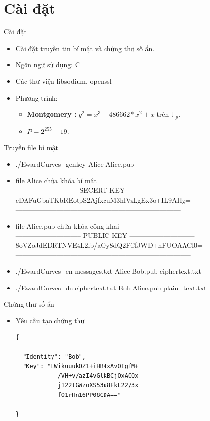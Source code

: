\documentclass[compress]{beamer}
\begin{document}
\section*{Cài đặt}
\begin{frame}{Cài đặt}
\begin{itemize}
\item Cài đặt truyền tin bí mật và chứng thư số ẩn.
\item Ngôn ngữ sử dụng: C
\item Các thư viện libsodium, openssl
\item Phương trình:
\begin{itemize}
\item \textbf{Montgomery :} $y^2 = x^3 + 486662*x^2 + x$ trên $\mathbb{F}_p$.
\item $P = 2^{255} - 19$.
\end{itemize}
\end{itemize}
\end{frame}
\begin{frame}{Truyền file bí mật}
\begin{itemize}
\item ./EwardCurves -genkey Alice Alice.pub
\item file Alice chứa khóa bí mật \\[10pt]
--------------------------- SECERT KEY --------------------------
cDAFuGbaTKbREotpS2AjfxeuM3hlVzLgEx3o+IL9AHg=
------------------------------------------------------------------------
\item file Alice.pub chứa khóa công khai \\[10pt]
----------------------------- PUBLIC KEY -----------------------------
8oVZoJdEDRTNVE4L2lb/aOy8dQ2FCfJWD+nFUOAACl0=
-----------------------------------------------------------------------------
\item ./EwardCurves -en messages.txt Alice Bob.pub ciphertext.txt
\item ./EwardCurves -de ciphertext.txt Bob Alice.pub plain\_text.txt
\end{itemize}
\end{frame}
\begin{frame}[fragile]{Chứng thư số ẩn}
\begin{itemize}
\item Yêu cầu tạo chứng thư
\begin{lstlisting}
{

  "Identity": "Bob",
  "Key": "LWikuuukOZ1+iHB4xAvOIgfM+
  			/VH+v/azI4vGlkBCjOxAOQx
  			j122tGWzoXS53u8FkL22/3x
  			fO1rHn16PP08CDA=="

}
\end{lstlisting}
\end{itemize}
\end{frame}
\end{document}
